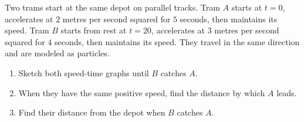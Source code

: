 Two trams start at the same depot on parallel tracks. Tram $A$ starts at $t=0$, accelerates at $2$ metres per second squared for $5$ seconds, then maintains its speed. Tram $B$ starts from rest at $t=20$, accelerates at $3$ metres per second squared for $4$ seconds, then maintains its speed. They travel in the same direction and are modeled as particles.
\begin{enumerate}\item Sketch both speed-time graphs until $B$ catches $A$.
\item When they have the same positive speed, find the distance by which $A$ leads.
\item Find their distance from the depot when $B$ catches $A$.\end{enumerate}
